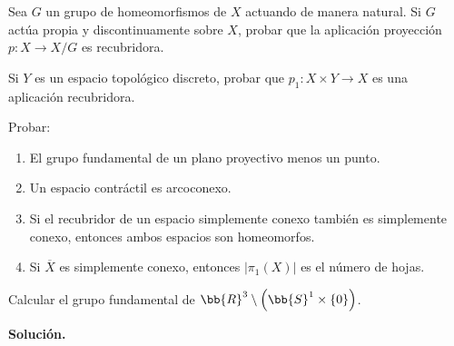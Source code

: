\documentclass[12pt]{article}
\begin{document}
    \begin{ejercicio}
        Sea $G$ un grupo de homeomorfismos de $X$ actuando de manera natural. Si $G$ actúa propia y discontinuamente sobre $X$, probar que la aplicación proyección $p:X\to X/G$ es recubridora.
    \end{ejercicio}

    \begin{ejercicio}
        Si $Y$ es un espacio topológico discreto, probar que $p_1:X\times Y\to X$ es una aplicación recubridora.
    \end{ejercicio}

    \begin{ejercicio}
        Probar:
        \begin{enumerate}
            \item El grupo fundamental de un plano proyectivo menos un punto.
            \item Un espacio contráctil es arcoconexo.
            \item Si el recubridor de un espacio simplemente conexo también es simplemente conexo, entonces ambos espacios son homeomorfos.
            \item Si $\overline{X}$ es simplemente conexo, entonces $|\pi_1(X)|$ es el número de hojas.
        \end{enumerate}
    \end{ejercicio}

    \begin{ejercicio}
        Calcular el grupo fundamental de $\bb{R}^3\setminus \left(\bb{S}^1\times \{0\}\right)$.
    \end{ejercicio}

    \newpage
    \setcounter{ejercicio}{0} %
    \noindent
    \textbf{Solución.}
\end{document}
